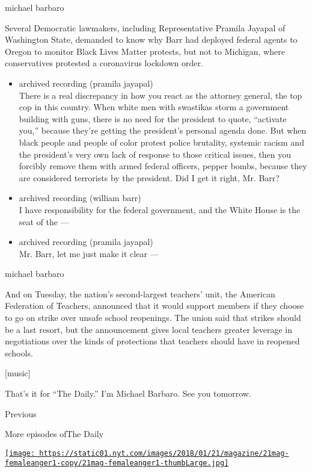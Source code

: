 michael barbaro

Several Democratic lawmakers, including Representative Pramila Jayapal
of Washington State, demanded to know why Barr had deployed federal
agents to Oregon to monitor Black Lives Matter protests, but not to
Michigan, where conservatives protested a coronavirus lockdown order.

\begin{itemize}
\item
  archived recording (pramila jayapal)\\
  There is a real discrepancy in how you react as the attorney general,
  the top cop in this country. When white men with swastikas storm a
  government building with guns, there is no need for the president to
  quote, ``activate you,'' because they're getting the president's
  personal agenda done. But when black people and people of color
  protest police brutality, systemic racism and the president's very own
  lack of response to those critical issues, then you forcibly remove
  them with armed federal officers, pepper bombs, because they are
  considered terrorists by the president. Did I get it right, Mr. Barr?
\item
  archived recording (william barr)\\
  I have responsibility for the federal government, and the White House
  is the seat of the ---
\item
  archived recording (pramila jayapal)\\
  Mr. Barr, let me just make it clear ---
\end{itemize}

michael barbaro

And on Tuesday, the nation's second-largest teachers' unit, the American
Federation of Teachers, announced that it would support members if they
choose to go on strike over unsafe school reopenings. The union said
that strikes should be a last resort, but the announcement gives local
teachers greater leverage in negotiations over the kinds of protections
that teachers should have in reopened schools.

{[}music{]}

That's it for ``The Daily.'' I'm Michael Barbaro. See you tomorrow.

Previous

More episodes ofThe Daily

\href{https://www.nytimes.com/2020/08/02/podcasts/the-daily/on-female-rage.html?action=click\&module=audio-series-bar\&region=header\&pgtype=Article}{\texttt{[image: https://static01.nyt.com/images/2018/01/21/magazine/21mag-femaleanger1-copy/21mag-femaleanger1-thumbLarge.jpg]}}

